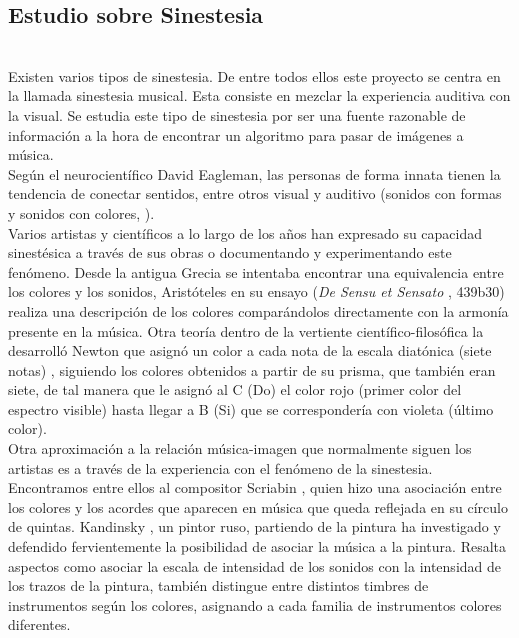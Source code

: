 \subsection{Estudio sobre Sinestesia}
\label{subsubsec:estudioSinestesia}

\\

Existen varios tipos de sinestesia. De entre todos ellos este proyecto se centra en la llamada sinestesia musical. Esta consiste en mezclar la experiencia auditiva con la visual. Se estudia este tipo de sinestesia por ser una fuente razonable de información a la hora de encontrar un algoritmo para pasar de imágenes a música.
\\Según el neurocientífico David Eagleman, las personas de forma innata tienen la tendencia de conectar sentidos, entre otros visual y auditivo (sonidos con formas y sonidos con colores, \cite{VideoRedesFliparColores}).\\

Varios artistas y científicos a lo largo de los años han expresado su capacidad sinestésica a través de sus obras o documentando y experimentando este fenómeno. Desde la antigua Grecia se intentaba encontrar una equivalencia entre los colores y los sonidos, Aristóteles en su ensayo (\emph{De Sensu et Sensato} \cite{DeSensuEtSensato}, 439b30) realiza una descripción de los colores comparándolos directamente con la armonía presente en la música. Otra teoría dentro de la vertiente científico-filosófica la desarrolló Newton que asignó un color a cada nota de la escala diatónica (siete notas) \cite{OpticksNewton}, siguiendo los colores obtenidos a partir de su prisma, que también eran siete, de tal manera que le asignó al C (Do) el color rojo (primer color del espectro visible) hasta llegar a B (Si) que se correspondería con violeta (último color).\\ 

Otra aproximación a la relación música-imagen que normalmente siguen los artistas es a través de la experiencia con el fenómeno de la sinestesia. Encontramos entre ellos al compositor Scriabin \cite{ScriabinQuintasColor}, quien hizo una asociación entre los colores y los acordes que aparecen en música que queda reflejada en su círculo de quintas. Kandinsky \cite{ConcerningSpiritualArt}, un pintor ruso, partiendo de la pintura ha investigado y defendido fervientemente la posibilidad de asociar la música a la pintura. Resalta aspectos como asociar la escala de intensidad de los sonidos con la intensidad de los trazos de la pintura, también distingue entre distintos timbres de instrumentos según los colores, asignando a cada familia de instrumentos colores diferentes.\\

